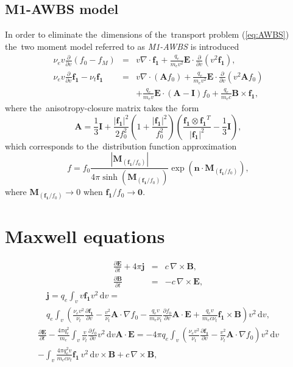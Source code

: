 \documentclass[preprint,12pt]{elsarticle}
\newcommand{\pdv}[2]{\frac{\partial{#1}}{\partial{#2}}}
\newcommand{\vect}[1]{\boldsymbol{#1}}
\newcommand{\matr}[1]{\mathbf{#1}}
\newcommand{\dI}{\text{d}}
\newcommand{\nue}{\nu_{e}}
\newcommand{\nutot}{\nu_{t}}
\newcommand{\vmag}{v}
\newcommand{\vn}{\vect{n}}
\newcommand{\E}{\vect{E}}
\newcommand{\B}{\vect{B}}
\newcommand{\qe}{q_e}
\newcommand{\me}{m_e}
\newcommand{\fM}{f_M}
\newcommand{\fzero}{f_0}
\newcommand{\fone}{\vect{f_1}}
\newcommand{\MI}{\matr{I}}
\newcommand{\MA}{\matr{A}}
\newcommand{\intv}{\int_{\vmag}}
\newcommand{\anisomega}{\fone/\fzero}
\newcommand{\acl}{\vect{M}_{\left(\anisomega\right)}}
\newcommand{\refeq}[1]{(\ref{#1})}
\newcounter{bla}
\begin{document}
\subsection{M1-AWBS model}
In order to eliminate the~dimensions of the~transport problem \refeq{eq:AWBS}
the~two moment model referred to as \textit{M1-AWBS} is introduced
\begin{eqnarray}
  \nue\vmag\pdv{}{\vmag}\left(\fzero - \fM \right) &=&
  \vmag\nabla\cdot\fone + \frac{\qe}{\me\vmag^2}\E\cdot\pdv{}{\vmag}
  \left( \vmag^2 \fone\right) , 
  \label{eq:M1f0}\\
  \nue\vmag\pdv{}{\vmag}\fone - \nutot\fone &=& 
  \vmag\nabla\cdot\left(\MA\fzero\right) + 
  \frac{\qe}{\me\vmag^2}\E\cdot\pdv{}{\vmag}
  \left( \vmag^2 \MA\fzero\right) \nonumber\\
  && + \frac{\qe}{\me\vmag}\E\cdot\left( \MA - \MI \right)\fzero +
  \frac{\qe}{\me c}\B\times\fone ,
  \label{eq:M1f1}
\end{eqnarray}
where the~anisotropy-closure matrix takes the~form
\begin{equation}
  \MA = \frac{1}{3}\MI + \frac{|\fone|^2}{2\fzero^2}
  \left( 1 + \frac{|\fone|^2}{\fzero^2} \right)
  \left( \frac{\fone\otimes\fone^T}{|\fone|^2} - \frac{1}{3}\MI\right) ,
\end{equation}
which corresponds to the~distribution function approximation
\begin{equation}
  f = \fzero \frac{\left|\acl\right|}{4\pi\sinh\left(\acl\right)}
  \exp\left(\vn\cdot\acl\right) ,
\end{equation}
where $\acl \rightarrow 0$ when $\anisomega \rightarrow \vect{0}$. 

\section{Maxwell equations}\label{sec:Efield}
\begin{eqnarray}
  \pdv{\E}{t} + 4\pi\vect{j} &=& c\, \nabla\times\B ,
  \label{eq:Ampere} \\
  \pdv{\B}{t} &=& -c\, \nabla\times\E ,
  \label{eq:Faraday}
\end{eqnarray}
\begin{multline}
  \vect{j} = \qe \intv\vmag\fone\vmag^2\, \dI\vmag = \\
  \qe \intv \left(\frac{\nue\vmag^2}{\nutot}\pdv{\fone}{\vmag}
  - \frac{\vmag^2}{\nutot}\MA\cdot\nabla\fzero - 
  \frac{\qe\vmag}{\me\nutot}\pdv{\fzero}{\vmag}\MA\cdot\E
   + \frac{\qe\vmag}{\me c\nutot}\fone\times\B\right) \vmag^2\, \dI\vmag ,
  \label{eq:current}
\end{multline}
\begin{multline}
  \pdv{\E}{t} - \frac{4\pi\qe^2}{\me}
  \intv\frac{\vmag}{\nutot} \pdv{\fzero}{\vmag}\vmag^2\, \dI\vmag \MA\cdot\E 
   = 
  - 4\pi\qe\intv\left( 
  \frac{\nue\vmag^2}{\nutot}\pdv{\fone}{\vmag}
  - \frac{\vmag^2}{\nutot}\MA\cdot\nabla\fzero\right)\vmag^2\, \dI\vmag  \\
  - \intv \frac{4\pi\qe^2\vmag}{\me c\nutot}\fone\, \vmag^2\, \dI\vmag \times\B 
  + c\, \nabla\times\B ,
  \label{eq:GeneralizedOhm} 
\end{multline}
\end{document}
